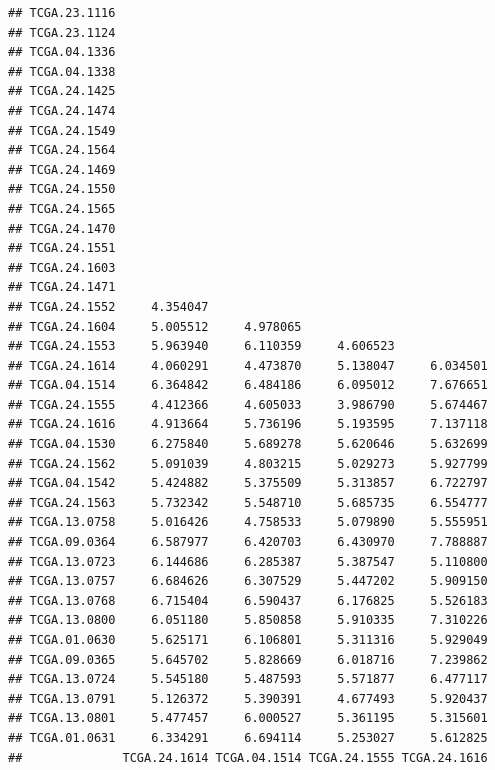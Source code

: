 \documentclass[UTF8]{beamer}\usepackage[]{graphicx}\usepackage[]{color}
\makeatletter
\newenvironment{kframe}{%
 \def\at@end@of@kframe{}%
 \ifinner\ifhmode%
  \def\at@end@of@kframe{\end{minipage}}%
  \begin{minipage}{\columnwidth}%
 \fi\fi%
 \def\FrameCommand##1{\hskip\@totalleftmargin \hskip-\fboxsep
 \colorbox{shadecolor}{##1}\hskip-\fboxsep
     \hskip-\linewidth \hskip-\@totalleftmargin \hskip\columnwidth}%
 \MakeFramed {\advance\hsize-\width
   \@totalleftmargin\z@ \linewidth\hsize
   \@setminipage}}%
 {\par\unskip\endMakeFramed%
 \at@end@of@kframe}
\newenvironment{knitrout}{}{} %
\makeatother
\begin{document}
\begin{frame}[fragile]
\begin{knitrout}
\begin{kframe}
\begin{verbatim}
## TCGA.23.1116                                                    
## TCGA.23.1124                                                    
## TCGA.04.1336                                                    
## TCGA.04.1338                                                    
## TCGA.24.1425                                                    
## TCGA.24.1474                                                    
## TCGA.24.1549                                                    
## TCGA.24.1564                                                    
## TCGA.24.1469                                                    
## TCGA.24.1550                                                    
## TCGA.24.1565                                                    
## TCGA.24.1470                                                    
## TCGA.24.1551                                                    
## TCGA.24.1603                                                    
## TCGA.24.1471                                                    
## TCGA.24.1552     4.354047                                       
## TCGA.24.1604     5.005512     4.978065                          
## TCGA.24.1553     5.963940     6.110359     4.606523             
## TCGA.24.1614     4.060291     4.473870     5.138047     6.034501
## TCGA.04.1514     6.364842     6.484186     6.095012     7.676651
## TCGA.24.1555     4.412366     4.605033     3.986790     5.674467
## TCGA.24.1616     4.913664     5.736196     5.193595     7.137118
## TCGA.04.1530     6.275840     5.689278     5.620646     5.632699
## TCGA.24.1562     5.091039     4.803215     5.029273     5.927799
## TCGA.04.1542     5.424882     5.375509     5.313857     6.722797
## TCGA.24.1563     5.732342     5.548710     5.685735     6.554777
## TCGA.13.0758     5.016426     4.758533     5.079890     5.555951
## TCGA.09.0364     6.587977     6.420703     6.430970     7.788887
## TCGA.13.0723     6.144686     6.285387     5.387547     5.110800
## TCGA.13.0757     6.684626     6.307529     5.447202     5.909150
## TCGA.13.0768     6.715404     6.590437     6.176825     5.526183
## TCGA.13.0800     6.051180     5.850858     5.910335     7.310226
## TCGA.01.0630     5.625171     6.106801     5.311316     5.929049
## TCGA.09.0365     5.645702     5.828669     6.018716     7.239862
## TCGA.13.0724     5.545180     5.487593     5.571877     6.477117
## TCGA.13.0791     5.126372     5.390391     4.677493     5.920437
## TCGA.13.0801     5.477457     6.000527     5.361195     5.315601
## TCGA.01.0631     6.334291     6.694114     5.253027     5.612825
##              TCGA.24.1614 TCGA.04.1514 TCGA.24.1555 TCGA.24.1616

\end{verbatim}
\end{kframe}
\end{knitrout}
\end{frame}
\end{document}
